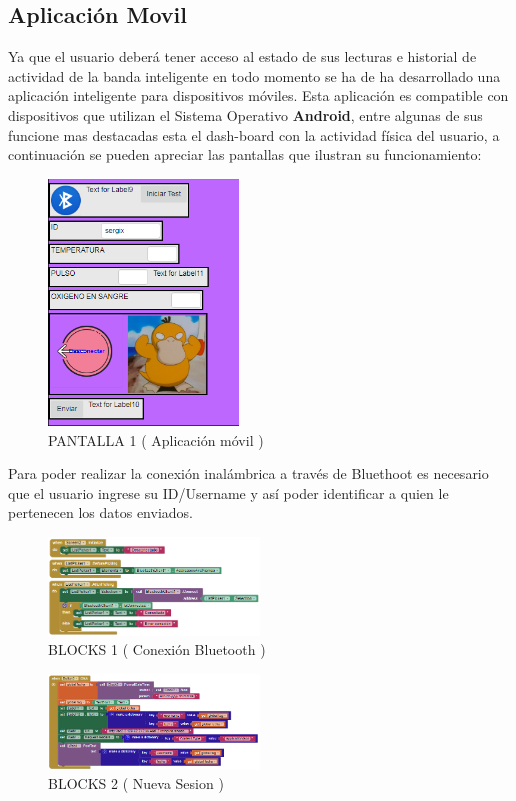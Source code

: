 \documentclass[osajnl,twocolumn,showpacs,superscriptaddress,10pt]{revtex4-1}
\begin{document}
\subsection{Aplicación Movil}
    Ya que el usuario deberá tener acceso al estado de sus lecturas e historial de actividad de la banda inteligente en todo momento se ha de ha desarrollado una aplicación inteligente para dispositivos móviles. Esta aplicación es compatible con dispositivos que utilizan el Sistema Operativo \textbf{Android}, entre algunas de sus funcione mas destacadas esta el dash-board con la actividad física del usuario, a continuación se pueden apreciar las pantallas que ilustran su funcionamiento:
    
\begin{figure} [H] \centering 
\caption{PANTALLA 1 ( Aplicación móvil )}
\includegraphics[width=0.45\textwidth]{PantallaPrincipal.png} 
\end{figure}

    Para poder realizar la conexión inalámbrica a través de  Bluethoot es necesario que el usuario ingrese su ID/Username y así poder identificar a quien le pertenecen los datos enviados.
    
\begin{figure} [H] \centering 
\caption{BLOCKS 1 ( Conexión Bluetooth )}
\includegraphics[width=0.5\textwidth]{ConexionBT.png} 
\end{figure}

\begin{figure} [H] \centering 
\caption{BLOCKS 2 ( Nueva Sesion )}
\includegraphics[width=0.5\textwidth]{NuevaSesion.PNG} 
\end{figure}
\end{document}
